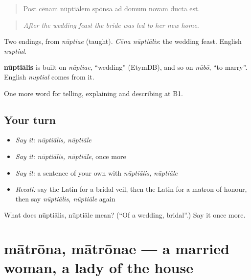 \begin{quote}
Post cēnam nūptiālem spōnsa ad domum novam ducta est.
\end{quote}

\begin{quote}
\emph{After the wedding feast the bride was led to her new home.}
\end{quote}

Two endings, from \emph{nūptiae} (taught). \emph{Cēna nūptiālis}: the wedding feast. English \emph{nuptial}.

\begin{cousinweb}
\textbf{nūptiālis} is built on \emph{nūptiae}, \textquotedblleft{}wedding\textquotedblright{} (EtymDB), and so on \emph{nūbō}, \textquotedblleft{}to marry\textquotedblright{}. English \emph{nuptial} comes from it.
\end{cousinweb}

\begin{grammarlens}[title={What you've built}]
One more word for telling, explaining and describing at B1.
\end{grammarlens}

\subsection*{Your turn}
\begin{itemize}
\raggedright
  \item \emph{Say it:} \emph{nūptiālis, nūptiāle}
  \item \emph{Say it:} \emph{nūptiālis, nūptiāle}, once more
  \item \emph{Say it:} a sentence of your own with \emph{nūptiālis, nūptiāle}
  \item \emph{Recall:} say the Latin for a bridal veil, then the Latin for a matron of honour, then say \emph{nūptiālis, nūptiāle} again
\end{itemize}

\begin{tcolorbox}[breakable,colback=teal!4,colframe=teal!35!black,title={Before you move on}]
What does nūptiālis, nūptiāle mean? (\textquotedblleft{}Of a wedding, bridal\textquotedblright{}.) Say it once more.
\end{tcolorbox}
\section[mātrōna, mātrōnae]{mātrōna, mātrōnae — a married woman, a lady of the house}

